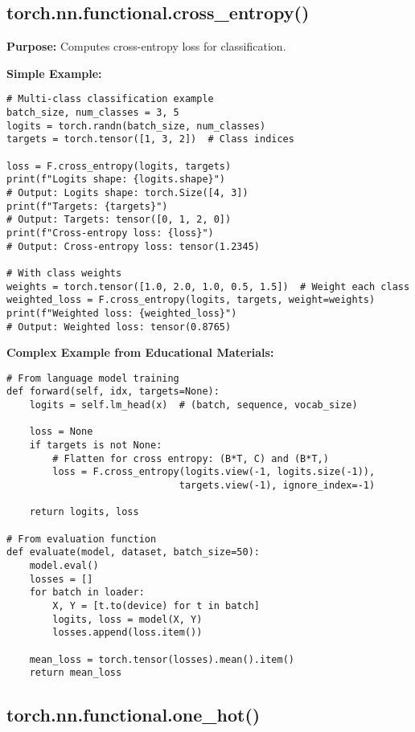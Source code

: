 \documentclass[11pt,a4paper]{book}
\begin{document}
\subsection{torch.nn.functional.cross\_entropy()}

\textbf{Purpose:} Computes cross-entropy loss for classification.

\textbf{Simple Example:}
\begin{verbatim}
# Multi-class classification example
batch_size, num_classes = 3, 5
logits = torch.randn(batch_size, num_classes)
targets = torch.tensor([1, 3, 2])  # Class indices

loss = F.cross_entropy(logits, targets)
print(f"Logits shape: {logits.shape}")
# Output: Logits shape: torch.Size([4, 3])
print(f"Targets: {targets}")
# Output: Targets: tensor([0, 1, 2, 0])
print(f"Cross-entropy loss: {loss}")
# Output: Cross-entropy loss: tensor(1.2345)

# With class weights
weights = torch.tensor([1.0, 2.0, 1.0, 0.5, 1.5])  # Weight each class
weighted_loss = F.cross_entropy(logits, targets, weight=weights)
print(f"Weighted loss: {weighted_loss}")
# Output: Weighted loss: tensor(0.8765)
\end{verbatim}

\textbf{Complex Example from Educational Materials:}
\begin{verbatim}
# From language model training
def forward(self, idx, targets=None):
    logits = self.lm_head(x)  # (batch, sequence, vocab_size)
    
    loss = None
    if targets is not None:
        # Flatten for cross entropy: (B*T, C) and (B*T,)
        loss = F.cross_entropy(logits.view(-1, logits.size(-1)), 
                              targets.view(-1), ignore_index=-1)
    
    return logits, loss

# From evaluation function
def evaluate(model, dataset, batch_size=50):
    model.eval()
    losses = []
    for batch in loader:
        X, Y = [t.to(device) for t in batch]
        logits, loss = model(X, Y)
        losses.append(loss.item())
    
    mean_loss = torch.tensor(losses).mean().item()
    return mean_loss
\end{verbatim}

\subsection{torch.nn.functional.one\_hot()}
\end{document}
